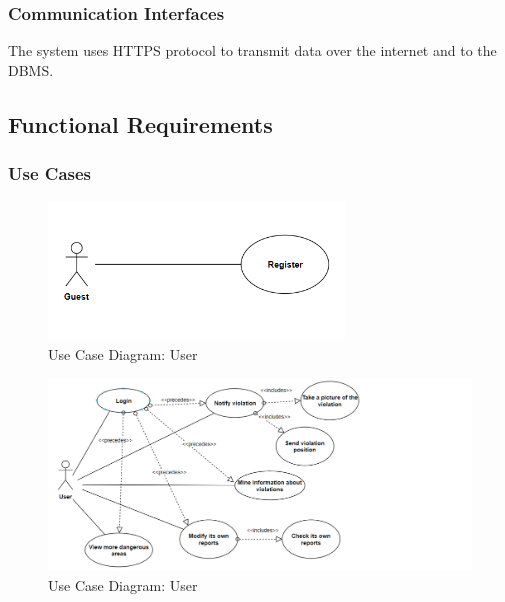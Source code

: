 \subsubsection{Communication Interfaces}
The system uses HTTPS protocol to transmit data over the internet and to the DBMS.
\subsection{Functional Requirements}


\subsubsection{Use Cases}


 \begin{figure}[H]
 \centering
        \includegraphics[width=0.7\textwidth]{Images/UCD_guest.PNG}
        \caption{Use Case Diagram: User}
    \end{figure}


 \begin{figure}[H]
        \includegraphics[width=1.5\textwidth,left]{Images/UCD_user_bis.PNG}
        \caption{Use Case Diagram: User}
    \end{figure}
    
    
    
